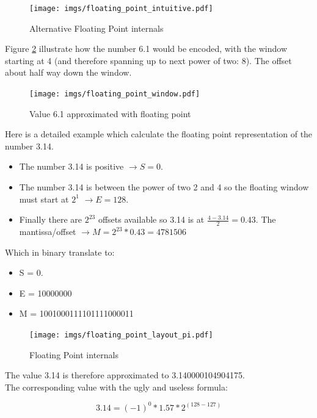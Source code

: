 \documentclass[book.tex]{subfiles}
\begin{document}
\begin{figure}[H]
\centering
\texttt{[image: imgs/floating\_point\_intuitive.pdf]}
\caption{Alternative Floating Point internals}
\label{fig:fp_internals}
\end{figure}
  \bigskip  

Figure \ref{fig:fp_internals_window} illustrate how the number 6.1 would be encoded, with the window starting at 4 (and therefore spanning up to next power of two: 8). The offset about half way down the window.

\begin{figure}[H]
\centering
\texttt{[image: imgs/floating\_point\_window.pdf]}

\caption{Value 6.1 approximated with floating point}
\label{fig:fp_internals_window}
\end{figure}
  \bigskip
  
Here is a detailed example which calculate the floating point representation of the number 3.14.
\begin{itemize}
 \item The number 3.14 is positive  $\rightarrow S=0$.
 \item The number 3.14 is between the power of two 2 and 4 so the floating window must start at $2^1$  $\rightarrow E=128$.
 \item Finally there are $2^{23}$ offsets available so 3.14 is at $\frac{4-3.14}{2} = 0.43 $. The mantissa/offset $\rightarrow M = 2^{23}*0.43 = 4781506$
\end{itemize}

Which in binary translate to:

\begin{itemize}
\item S = 0.
\item E = 10000000
\item M = 1001000111101111000011
\end{itemize}

\begin{figure}[H]
\centering
\texttt{[image: imgs/floating\_point\_layout\_pi.pdf]}
\caption{Floating Point internals}
\label{fig:fp_internals}
\end{figure}
  \bigskip

The value 3.14 is therefore approximated to 3.140000104904175.\\

The corresponding value with the ugly and useless formula:

\begin{equation}
3.14 = (-1)^0 * 1.57 * 2^{(128-127)}
\end{equation}
\end{document}
